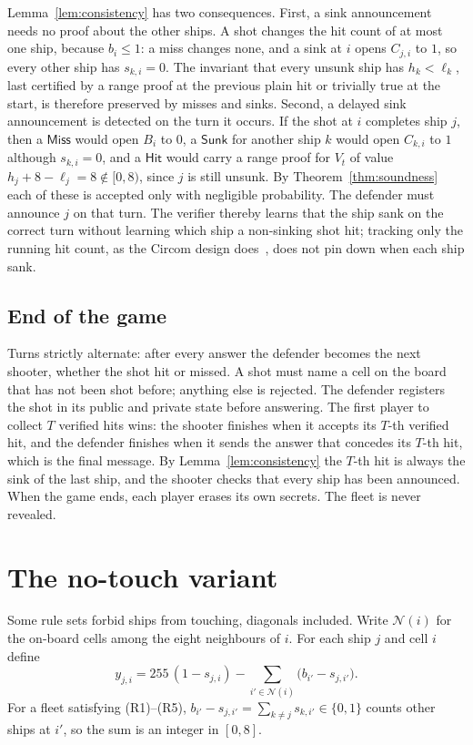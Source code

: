 \documentclass[11pt]{article}
\theoremstyle{definition}
\theoremstyle{remark}
\begin{document}
Lemma~\ref{lem:consistency} has two consequences. First, a sink announcement needs no proof about the other ships. A shot changes the hit count of at most one ship, because $b_i\le1$: a miss changes none, and a sink at $i$ opens $C_{j,i}$ to $1$, so every other ship has $s_{k,i}=0$. The invariant that every unsunk ship has $h_k<\ell_k$, last certified by a range proof at the previous plain hit or trivially true at the start, is therefore preserved by misses and sinks. Second, a delayed sink announcement is detected on the turn it occurs. If the shot at $i$ completes ship $j$, then a $\mathsf{Miss}$ would open $B_i$ to $0$, a $\mathsf{Sunk}$ for another ship $k$ would open $C_{k,i}$ to $1$ although $s_{k,i}=0$, and a $\mathsf{Hit}$ would carry a range proof for $V_t$ of value $h_j+8-\ell_j=8\notin[0,8)$, since $j$ is still unsunk. By Theorem~\ref{thm:soundness} each of these is accepted only with negligible probability. The defender must announce $j$ on that turn. The verifier thereby learns that the ship sank on the correct turn without learning which ship a non-sinking shot hit; tracking only the running hit count, as the Circom design does~\cite{battlezips}, does not pin down when each ship sank.

\subsection{End of the game}\label{sec:end}
Turns strictly alternate: after every answer the defender becomes the next shooter, whether the shot hit or missed. A shot must name a cell on the board that has not been shot before; anything else is rejected. The defender registers the shot in its public and private state before answering. The first player to collect $T$ verified hits wins: the shooter finishes when it accepts its $T$-th verified hit, and the defender finishes when it sends the answer that concedes its $T$-th hit, which is the final message. By Lemma~\ref{lem:consistency} the $T$-th hit is always the sink of the last ship, and the shooter checks that every ship has been announced. When the game ends, each player erases its own secrets. The fleet is never revealed.

\section{The no-touch variant}\label{sec:notouch}
Some rule sets forbid ships from touching, diagonals included. Write $\mathcal N(i)$ for the on-board cells among the eight neighbours of $i$. For each ship $j$ and cell $i$ define
\[
  y_{j,i}=255\,(1-s_{j,i})-\sum_{i'\in\mathcal N(i)}\bigl(b_{i'}-s_{j,i'}\bigr).
\]
For a fleet satisfying (R1)--(R5), $b_{i'}-s_{j,i'}=\sum_{k\ne j}s_{k,i'}\in\{0,1\}$ counts other ships at $i'$, so the sum is an integer in $[0,8]$.
\end{document}
